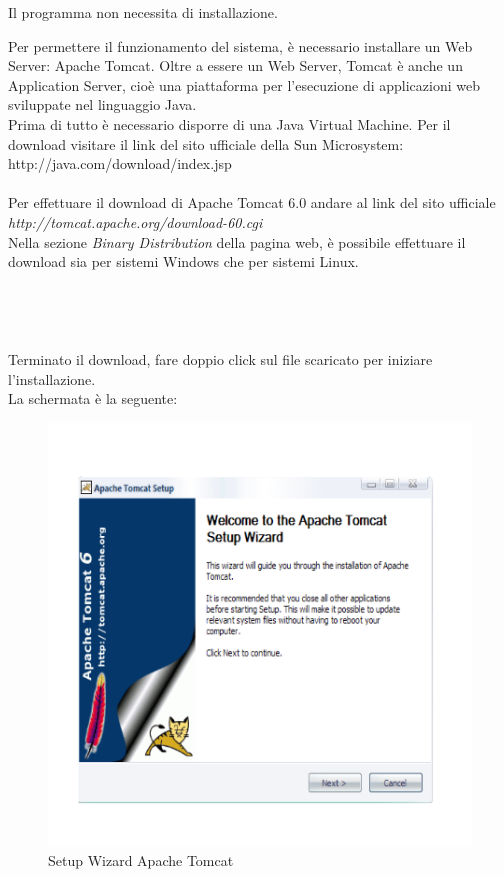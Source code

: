  
Il programma non necessita di installazione.
 
Per permettere il funzionamento del sistema, \`e necessario installare un Web Server: Apache Tomcat. Oltre a essere un Web Server, Tomcat \`e anche un
Application Server, cio\`e una piattaforma per l'esecuzione di applicazioni web sviluppate nel linguaggio Java.\\
Prima di tutto \`e necessario disporre di una Java Virtual Machine. Per il download visitare il link del sito ufficiale della Sun Microsystem:\\
http://java.com/download/index.jsp\\
\\
Per effettuare il download di Apache Tomcat 6.0 andare al link del sito ufficiale \textit{http://tomcat.apache.org/download-60.cgi}\\
Nella sezione \textit{Binary Distribution} della pagina web, \`e possibile effettuare il download sia per sistemi Windows che per sistemi Linux.\\
\\\\
\\
\\
Terminato il download, fare doppio click sul file scaricato per iniziare l'installazione.\\
La schermata \`e la seguente:
 
\begin{figure}[!ht]
\centering
\includegraphics[scale=0.7]{images/InstallTomcat1.png}
\caption{Setup Wizard Apache Tomcat}
\end{figure}
 
